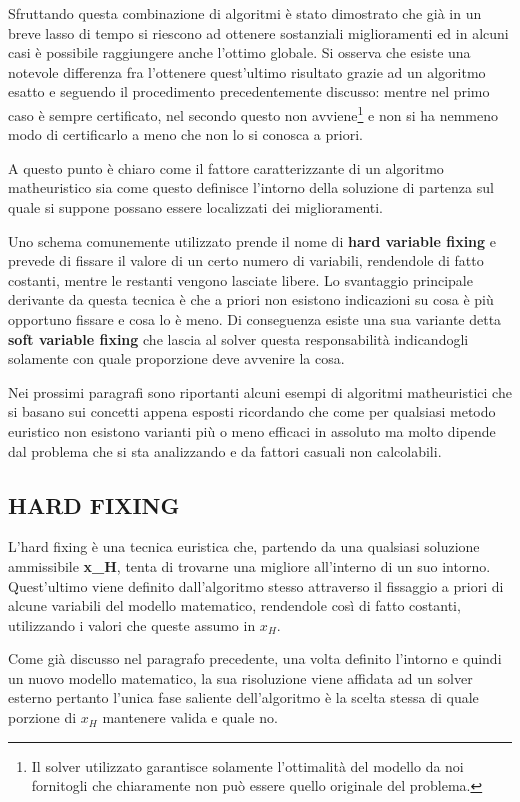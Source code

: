 \documentclass[11pt]{article}
\begin{document}
Sfruttando questa combinazione di algoritmi è stato dimostrato che già in un breve lasso di tempo si riescono ad ottenere sostanziali miglioramenti ed in alcuni casi è possibile raggiungere anche l'ottimo globale. Si osserva che esiste una notevole differenza fra l'ottenere quest'ultimo risultato grazie ad un algoritmo esatto e seguendo il procedimento precedentemente discusso: mentre nel primo caso è sempre certificato, nel secondo questo non avviene\footnote{Il solver utilizzato garantisce solamente l'ottimalità del modello da noi fornitogli che chiaramente non può essere quello originale del problema.} e non si ha nemmeno modo di certificarlo a meno che non lo si conosca a priori.

A questo punto è chiaro come il fattore caratterizzante di un algoritmo matheuristico sia come questo definisce l'intorno della soluzione di partenza sul quale si suppone possano essere localizzati dei miglioramenti. 

Uno schema comunemente utilizzato prende il nome di \textbf{hard variable fixing} e prevede di fissare il valore di un certo numero di variabili, rendendole di fatto costanti, mentre le restanti vengono lasciate libere. Lo svantaggio principale derivante da questa tecnica è che a priori non esistono indicazioni su cosa è più opportuno fissare e cosa lo è meno. Di conseguenza esiste una sua variante detta \textbf{soft variable fixing} che lascia al solver questa responsabilità indicandogli solamente con quale proporzione deve avvenire la cosa.

Nei prossimi paragrafi sono riportanti alcuni esempi di algoritmi matheuristici che si basano sui concetti appena esposti ricordando che come per qualsiasi metodo euristico non esistono varianti più o meno efficaci in assoluto ma molto dipende dal problema che si sta analizzando e da fattori casuali non calcolabili.

\subsection*{HARD FIXING}

L'hard fixing è una tecnica euristica che, partendo da una qualsiasi soluzione ammissibile \textbf{x_H}, tenta di trovarne una migliore all'interno di un suo intorno. Quest'ultimo viene definito dall'algoritmo stesso attraverso il fissaggio a priori di alcune variabili del modello matematico, rendendole così di fatto costanti, utilizzando i valori che queste assumo in $x_H$. 

Come già discusso nel paragrafo precedente, una volta definito l'intorno e quindi un nuovo modello matematico, la sua risoluzione viene affidata ad un solver esterno pertanto l'unica fase saliente dell'algoritmo è la scelta stessa di quale porzione di $x_H$ mantenere valida e quale no. 
\end{document}
